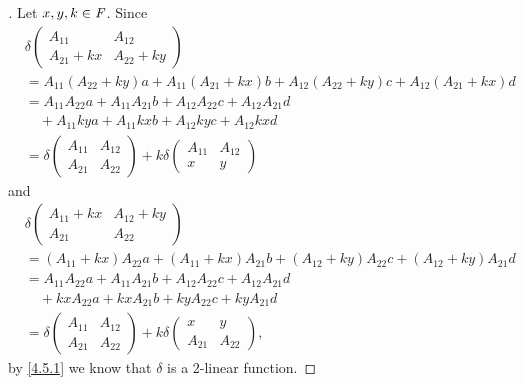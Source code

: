 \begin{proof}[]
  Let \(x, y, k \in \mathit{F}\).
  Since
  \begin{align*}
     & \delta\begin{pmatrix}
               A_{1 1}      & A_{1 2}      \\
               A_{2 1} + kx & A_{2 2} + ky
             \end{pmatrix}                                                                           \\
     & = A_{1 1} (A_{2 2} + ky) a + A_{1 1} (A_{2 1} + kx) b + A_{1 2} (A_{2 2} + ky) c + A_{1 2} (A_{2 1} + kx) d \\
     & = A_{1 1} A_{2 2} a + A_{1 1} A_{2 1} b + A_{1 2} A_{2 2} c + A_{1 2} A_{2 1} d                             \\
     & \quad + A_{1 1} ky a + A_{1 1} kx b + A_{1 2} ky c + A_{1 2} kx d                                           \\
     & = \delta\begin{pmatrix}
                 A_{1 1} & A_{1 2} \\
                 A_{2 1} & A_{2 2}
               \end{pmatrix} + k \delta\begin{pmatrix}
                                         A_{1 1} & A_{1 2} \\
                                         x       & y
                                       \end{pmatrix}
  \end{align*}
  and
  \begin{align*}
     & \delta\begin{pmatrix}
               A_{1 1} + kx & A_{1 2} + ky \\
               A_{2 1}      & A_{2 2}
             \end{pmatrix}                                                                           \\
     & = (A_{1 1} + kx) A_{2 2} a + (A_{1 1} + kx) A_{2 1} b + (A_{1 2} + ky) A_{2 2} c + (A_{1 2} + ky) A_{2 1} d \\
     & = A_{1 1} A_{2 2} a + A_{1 1} A_{2 1} b + A_{1 2} A_{2 2} c + A_{1 2} A_{2 1} d                             \\
     & \quad + kx A_{2 2} a + kx A_{2 1} b + ky A_{2 2} c + ky A_{2 1} d                                           \\
     & = \delta\begin{pmatrix}
                 A_{1 1} & A_{1 2} \\
                 A_{2 1} & A_{2 2}
               \end{pmatrix} + k \delta\begin{pmatrix}
                                         x       & y       \\
                                         A_{2 1} & A_{2 2}
                                       \end{pmatrix},
  \end{align*}
  by \cref{4.5.1} we know that \(\delta\) is a \(2\)-linear function.
\end{proof}

